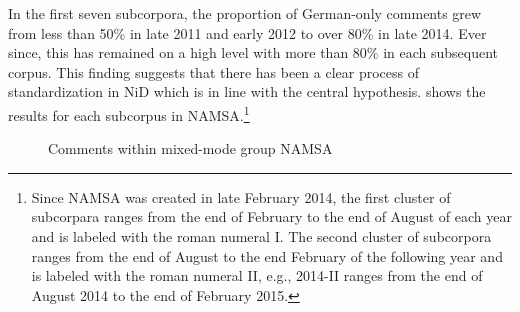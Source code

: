 \documentclass[output=paper]{langsci/langscibook}
\begin{document}
In the first seven subcorpora, the proportion of German-only comments grew from less than 50\% in late 2011 and early 2012 to over 80\% in late 2014. Ever since, this has remained on a high level with more than 80\% in each subsequent corpus. This finding suggests that there has been a clear process of standardization in NiD which is in line with the central hypothesis.  shows the results for each subcorpus in NAMSA.{\footnote{Since NAMSA was created in late February 2014, the first cluster of subcorpara ranges from the end of February to the end of August of each year and is labeled with the roman numeral I. The second cluster of subcorpora ranges from the end of August to the end February of the following year and is labeled with the roman numeral II, e.g., 2014-II ranges from the end of August 2014 to the end of February 2015.}}

  \begin{figure}
\caption{Comments within mixed-mode group NAMSA}
\label{fig:radke:7}
\end{figure}  
\end{document}
